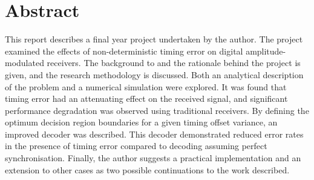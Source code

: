 

\begingroup
\let\clearpage\relax
\let\cleardoublepage\relax
\let\cleardoublepage\relax

\chapter*{Abstract} %

This report describes a final year project undertaken by the author. The project examined the effects of non-deterministic timing error on digital amplitude-modulated receivers. The background to and the rationale behind the project is given, and the research methodology is discussed. Both an analytical description of the problem and a numerical simulation were explored. It was found that timing error had an attenuating effect on the received signal, and significant performance degradation was observed using traditional receivers. By defining the optimum decision region boundaries for a given timing offset variance, an improved decoder was described. This decoder demonstrated reduced error rates in the presence of timing error compared to decoding assuming perfect synchronisation. Finally, the author suggests a practical implementation and an extension to other cases as two possible continuations to the work described.

\endgroup			

\vfill